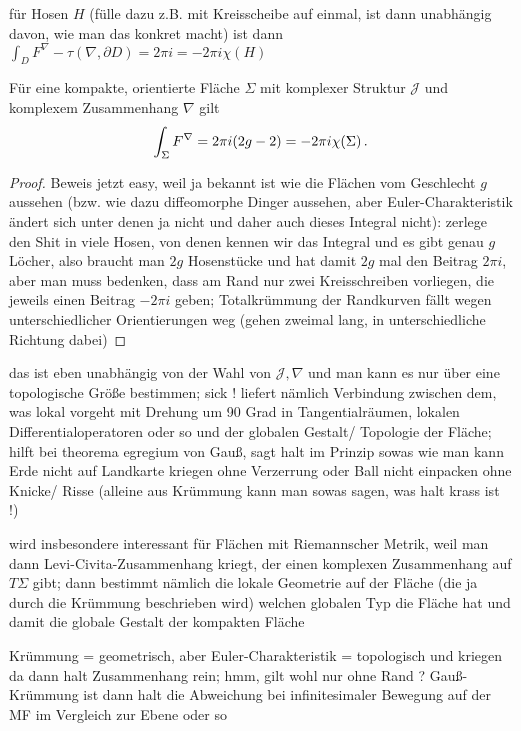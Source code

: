 \documentclass[../H_Analysis_main.tex]{subfiles}
\begin{document}
für Hosen $H$ (fülle dazu z.B. mit Kreisscheibe auf einmal, ist dann unabhängig davon, wie man das konkret macht) ist dann $\int_D F^\nabla - \tau(\nabla, \partial D) = 2\pi i = -2\pi i \chi(H)$


\begin{satz}
Für eine kompakte, orientierte Fläche $\Sigma$ mit komplexer Struktur $\mathcal{J}$ und komplexem Zusammenhang $\nabla$ gilt
\begin{equation}
\int_\Sigma F^\nabla = 2 \pi i \qty(2 g - 2) = - 2\pi i \chi(\Sigma) \, .
\end{equation}
\end{satz}
\begin{proof}
Beweis jetzt easy, weil ja bekannt ist wie die Flächen vom Geschlecht $g$ aussehen (bzw. wie dazu diffeomorphe Dinger aussehen, aber Euler-Charakteristik ändert sich unter denen ja nicht und daher auch dieses Integral nicht): zerlege den Shit in viele Hosen, von denen kennen wir das Integral und es gibt genau $g$ Löcher, also braucht man $2g$ Hosenstücke und hat damit $2g$ mal den Beitrag $2 \pi i$, aber man muss bedenken, dass am Rand nur zwei Kreisschreiben vorliegen, die jeweils einen Beitrag $-2 \pi i$ geben; Totalkrümmung der Randkurven fällt wegen unterschiedlicher Orientierungen weg (gehen zweimal lang, in unterschiedliche Richtung dabei)
\end{proof}
das ist eben unabhängig von der Wahl von $\mathcal{J}, \nabla$ und man kann es nur über eine topologische Größe bestimmen; sick ! liefert nämlich Verbindung zwischen dem, was lokal vorgeht mit Drehung um 90 Grad in Tangentialräumen, lokalen Differentialoperatoren oder so und der globalen Gestalt/ Topologie der Fläche; hilft bei theorema egregium von Gauß, sagt halt im Prinzip sowas wie man kann Erde nicht auf Landkarte kriegen ohne Verzerrung oder Ball nicht einpacken ohne Knicke/ Risse (alleine aus Krümmung kann man sowas sagen, was halt krass ist !)


wird insbesondere interessant für Flächen mit Riemannscher Metrik, weil man dann Levi-Civita-Zusammenhang kriegt, der einen komplexen Zusammenhang auf $T\Sigma$ gibt; dann bestimmt nämlich die lokale Geometrie auf der Fläche (die ja durch die Krümmung beschrieben wird) welchen globalen Typ die Fläche hat und damit die globale Gestalt der kompakten Fläche


Krümmung = geometrisch, aber Euler-Charakteristik = topologisch und kriegen da dann halt Zusammenhang rein; hmm, gilt wohl nur ohne Rand ? Gauß-Krümmung ist dann halt die Abweichung bei infinitesimaler Bewegung auf der MF im Vergleich zur Ebene oder so
\end{document}
